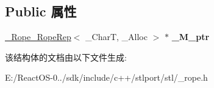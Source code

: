 \subsection*{Public 属性}
\begin{DoxyCompactItemize}
\item 
\mbox{\label{struct___rope__self__destruct__ptr_ae5345f49af5c0643a2b05276da3d5f7f}} 
\hyperlink{struct___rope___rope_rep}{\+\_\+\+Rope\+\_\+\+Rope\+Rep}$<$ \+\_\+\+CharT, \+\_\+\+Alloc $>$ $\ast$ {\bfseries \+\_\+\+M\+\_\+ptr}
\end{DoxyCompactItemize}


该结构体的文档由以下文件生成\+:\begin{DoxyCompactItemize}
\item 
E\+:/\+React\+O\+S-\/0../sdk/include/c++/stlport/stl/\+\_\+rope.\+h\end{DoxyCompactItemize}
